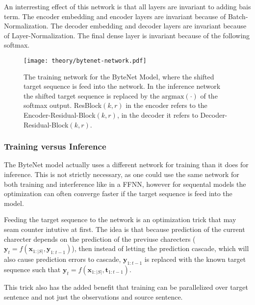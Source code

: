 An interresting effect of this network is that all layers are invariant to adding bais term. The encoder embedding and encoder layers are invariant because of Batch-Normalization. The decoder embedding and decoder layers are invariant because of Layer-Normalization. The final dense layer is invariant because of the following softmax.

\begin{figure}[h]
    \centering
    \texttt{[image: theory/bytenet-network.pdf]}
    \caption{The training network for the ByteNet Model, where the shifted target sequence is feed into the network. In the inference network the shifted target sequence is replaced by the $\mathrm{argmax}(\cdot)$ of the softmax output. ResBlock$(k, r)$ in the encoder refers to the Encoder-Residual-Block$(k, r)$, in the decoder it refers to Decoder-Residual-Block$(k, r)$.}
    \label{fig:bytenet:network}
\end{figure}

\subsubsection{Training versus Inference}
The ByteNet model actually uses a different network for training than it does for inference. This is not strictly necessary, as one could use the same network for both training and interference like in a FFNN, however for sequental models the optimization can often converge faster if the target sequence is feed into the model.

Feeding the target sequence to the network is an optimization trick that may seam counter intutive at first. The idea is that because prediction of the current charecter depends on the prediction of the previuse charecters ($\mathbf{y}_t = f(\mathbf{x}_{1:|S|}, \mathbf{y}_{1:t-1})$), then instead of letting the prediction cascade, which will also cause prediction errors to cascade, $\mathbf{y}_{1:t-1}$ is replaced with the known target sequence such that $\mathbf{y}_t = f(\mathbf{x}_{1:|S|}, \mathbf{t}_{1:t-1})$.

This trick also has the added benefit that training can be parallelized over target sentence and not just the observations and source sentence. 

